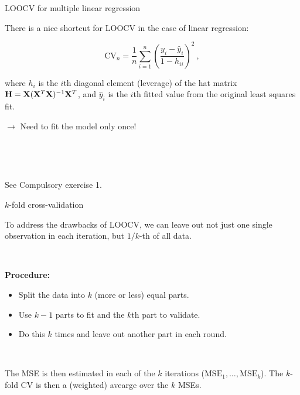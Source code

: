 \documentclass[
  10pt,
  ignorenonframetext,
]{beamer}
\providecommand{\tightlist}{%
  \setlength{\itemsep}{0pt}\setlength{\parskip}{0pt}}
\begin{document}
\begin{frame}
\begin{block}{LOOCV for multiple linear regression}
\protect\hypertarget{loocv-for-multiple-linear-regression}{}
\vspace{2mm}

There is a nice shortcut for LOOCV in the case of linear regression:

\[ \text{CV}_{n}=\frac{1}{n}\sum_{i=1}^n \left( \frac{y_i-\hat{y}_i}{1-h_{ii}} \right) ^2 \ ,\]

where \(h_i\) is the \(i\)th diagonal element (leverage) of the hat
matrix \({\bf H}={\bf X}({\bf X}^T{\bf X})^{-1}{\bf X}^T\), and
\(\hat{y}_i\) is the \(i\)th fitted value from the original least
squares fit.

\vspace{2mm}

\(\rightarrow\) Need to fit the model only once!

\(~\)

\(~\)

See Compulsory exercise 1.
\end{block}
\end{frame}

\begin{frame}
\begin{block}{\(k\)-fold cross-validation}
\protect\hypertarget{k-fold-cross-validation}{}
\(~\)

To address the drawbacks of LOOCV, we can leave out not just one single
observation in each iteration, but \(1/k\)-th of all data.

\(~\)

\textbf{Procedure:}

\begin{itemize}
\tightlist
\item
  Split the data into \(k\) (more or less) equal parts.
\end{itemize}

\vspace{2mm}

\begin{itemize}
\tightlist
\item
  Use \(k-1\) parts to fit and the \(k\)th part to validate.
\end{itemize}

\vspace{2mm}

\begin{itemize}
\tightlist
\item
  Do this \(k\) times and leave out another part in each round.
\end{itemize}

\(~\)

The MSE is then estimated in each of the \(k\) iterations
(\(\text{MSE}_1,\ldots,\text{MSE}_k\)). The \(k\)-fold CV is then a
(weighted) avearge over the \(k\) MSEs.
\end{block}
\end{frame}
\end{document}
